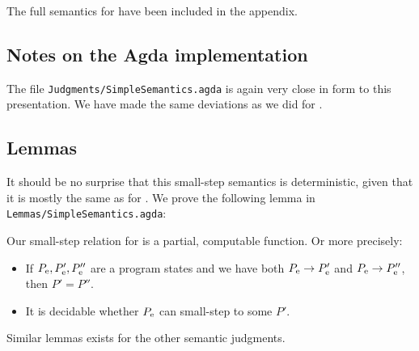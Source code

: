 The full semantics for \ATALe have been included in the appendix.

\subsection{Notes on the Agda implementation}

The file \texttt{Judgments/SimpleSemantics.agda} is again very close in form to
this presentation. We have made the same deviations as we did for \ATAL.

\subsection{Lemmas}

It should be no surprise that this small-step semantics is deterministic, given
that it is mostly the same as for \ATAL. We prove the following lemma in
\texttt{Lemmas/SimpleSemantics.agda}:

\begin{lemma}
  \label{lemma:computsimple}
  Our small-step relation for \ATALe is a partial, computable function. Or more
  precisely:

  \begin{itemize}
  \item If $P_{\mathrm{e}}, P'_{\mathrm{e}}, P''_{\mathrm{e}}$ are a program states and we
    have both ${P_{\mathrm{e}}} -> {P'_{\mathrm{e}}}$ and
    ${P_{\mathrm{e}}} -> {P''_{\mathrm{e}}}$, then $P' = P''$.
  \item It is decidable whether $P_{\mathrm{e}}$ can small-step to some $P'$.
  \end{itemize}

  Similar lemmas exists for the other semantic judgments.
\end{lemma}
